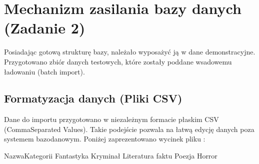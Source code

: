 \documentclass[letterpaper,10pt,english]{sphinxmanual}
\begin{document}
\begin{sphinxVerbatim}[commandchars=\\\{\}]
\end{sphinxVerbatim}


\section{Mechanizm zasilania bazy danych (Zadanie 2)}
\label{\detokenize{rozdzial_4/index:mechanizm-zasilania-bazy-danych-zadanie-2}}
\sphinxAtStartPar
Posiadając gotową strukturę bazy, należało wyposażyć ją w dane demonstracyjne. Przygotowano zbiór danych testowych, które zostały poddane wsadowemu ładowaniu (batch import).


\subsection{Formatyzacja danych (Pliki CSV)}
\label{\detokenize{rozdzial_4/index:formatyzacja-danych-pliki-csv}}
\sphinxAtStartPar
Dane do importu przygotowano w niezależnym formacie płaskim CSV (Comma\sphinxhyphen{}Separated Values). Takie podejście pozwala na łatwą edycję danych poza systemem bazodanowym. Poniżej zaprezentowano wycinek pliku :

\begin{sphinxVerbatim}[commandchars=\\\{\}]
Nazwa\PYGZus{}Kategorii
Fantastyka
Kryminał
Literatura faktu
Poezja
Horror
\end{sphinxVerbatim}
\end{document}
